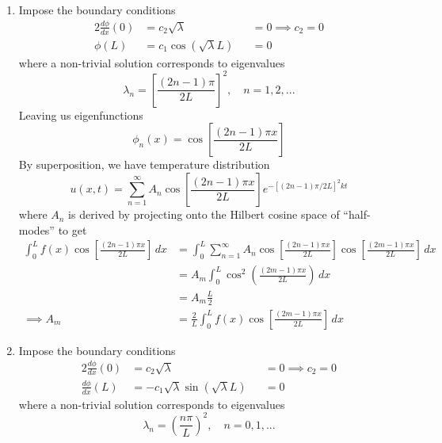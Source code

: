 \documentclass[a4paper]{article}
\begin{document}
\begin{enumerate}[label=(\alph*)]
\begin{align*}
														  & = A_{m}\frac{L}{2} \\
		\implies A_{m} & = \frac{2}{L}\int^{L}_{0} f \!\left( x \right)\sin\!\left[\frac{\!\left( 2m - 1 \right)\pi x}{2L}\right] \, dx 
	\end{align*}
	\item Impose the boundary conditions
	\begin{alignat*}{2}
		\frac{d \phi}{d x}\!\left( 0 \right) & = c_{2}\sqrt{\lambda} && = 0 \implies c_{2} = 0 \\
		\phi \!\left( L \right) & = c_{1}\cos\!\left(\sqrt{\lambda}L\right) && = 0
	\end{alignat*}
	where a non-trivial solution corresponds to eigenvalues
	\[
		\lambda_{n} = \!\left[ \frac{\!\left( 2n - 1 \right)\pi}{2L} \right]^{2}, \quad n = 1, 2, ...
	\]
	Leaving us eigenfunctions
	\[
		\phi_{n}\!\left( x \right) = \cos\!\left[\frac{\!\left( 2n - 1 \right)\pi x}{2L}\right]
	\]
	By superposition, we have temperature distribution
	\[
		u \!\left( x,t \right) = \sum^{\infty}_{n=1} A_{n}\cos\!\left[\frac{\!\left( 2n - 1 \right)\pi x}{2L}\right]e^{-\!\left[ \!\left( 2n - 1 \right) \pi / 2L \right]^{2}kt}
	\]
	where \( A_{n} \) is derived by projecting onto the Hilbert cosine space of ``half-modes'' to get
	\begin{align*}
		\int^{L}_{0} f \!\left( x \right)\cos\!\left[\frac{\!\left( 2n - 1 \right)\pi x}{2L}\right] \, dx & = \int^{L}_{0} \sum^{\infty}_{n=1} A_{n}\cos\!\left[\frac{\!\left( 2n - 1 \right)\pi x}{2L}\right]\cos\!\left[\frac{\!\left( 2m - 1 \right)\pi x}{2L}\right] \, dx  \\
		 & = A_{m}\int^{L}_{0} \cos^{2}\!\left(\frac{\!\left( 2m - 1 \right)\pi x}{2L}\right) \, dx \\ 
		 & = A_{m}\frac{L}{2} \\
		\implies A_{m} & = \frac{2}{L}\int^{L}_{0} f \!\left( x \right)\cos\!\left[\frac{\!\left( 2m - 1 \right)\pi x}{2L}\right] \, dx
	\end{align*}
	\item Impose the boundary conditions
	\begin{alignat*}{2}
		\frac{d \phi}{d x}\!\left( 0 \right) & = c_{2}\sqrt{\lambda} && = 0 \implies c_{2} = 0 \\
		\frac{d \phi}{d x}\!\left( L \right) & = -c_{1}\sqrt{\lambda}\sin\!\left(\sqrt{\lambda}L\right) && = 0
	\end{alignat*}
	where a non-trivial solution corresponds to eigenvalues
	\[
		\lambda_{n} = \!\left( \frac{n \pi}{L} \right)^{2}, \quad n = 0, 1, ...
\]
\end{enumerate}
\end{document}
